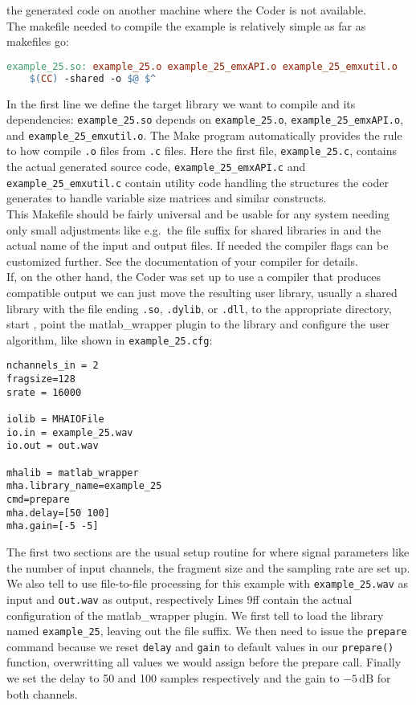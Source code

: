\documentclass[11pt,a4paper,twoside]{article}
\newcommand{\+}{\discretionary{\mbox{\scriptsize$\hookleftarrow$}}{}{}}
\begin{document}
the generated code on another machine where the Coder is not available. \\
The makefile needed to compile the example is relatively simple as far as
makefiles go:
\begin{lstlisting}[language=make]
example_25.so: example_25.o example_25_emxAPI.o example_25_emxutil.o
    $(CC) -shared -o $@ $^
\end{lstlisting}
In the first line we define the target library we want to compile and its dependencies:
\texttt{example\_25.so} depends on \texttt{example\_25.o}, \texttt{example\_25\_emxAPI.o}, 
and \texttt{example\_25\_emxutil.o}. The Make program automatically provides the rule 
to how compile \texttt{.o} files from \texttt{.c} files.
Here the first file, \texttt{example\_25.c}, contains the actual
generated source code, \texttt{example\_25\_emxAPI.c} and
\texttt{example\_25\_emxutil.c} contain utility code handling the structures the
\Matlab{} coder generates to handle variable size matrices and similar
constructs. \\
This Makefile should be fairly universal and be usable for any system needing only 
small adjustments like e.g.\ the file suffix for shared libraries in and the actual 
name of the input and output files. If needed the compiler flags can be customized further.
See the documentation of your compiler for details. \\
If, on the other hand, the \Matlab{} Coder was set up to use a compiler that produces \mha{} compatible
output we can just move the resulting user library, usually a shared library with the file ending
\texttt{.so}, \texttt{.dylib}, or \texttt{.dll}, to the appropriate directory, start \mha{},
point the matlab\_wrapper plugin to the library and configure the user
algorithm, like shown in \texttt{example\_25.cfg}:
\begin{lstlisting}
nchannels_in = 2
fragsize=128
srate = 16000

iolib = MHAIOFile
io.in = example_25.wav
io.out = out.wav

mhalib = matlab_wrapper
mha.library_name=example_25
cmd=prepare
mha.delay=[50 100]
mha.gain=[-5 -5]
\end{lstlisting}
The first two sections are the usual setup routine for \mha{} where signal
parameters like the number of input channels, the fragment size and the sampling
rate are set up. We also tell \mha{} to use file-to-file processing for this
example with \texttt{example\_25.wav} as input and \texttt{out.wav} as output, respectively
Lines 9ff contain the actual configuration of the matlab\_wrapper plugin. We
first tell \mha{} to load the library named \texttt{example\_25}, leaving out the
file suffix. We then need to issue the \texttt{prepare} command because we reset
\texttt{delay} and \texttt{gain} to default values in our \texttt{prepare()}
function, overwritting all values we would assign before the prepare call.
Finally we set the delay to 50 and 100 samples respectively and the
gain to $-5\,\mathrm{dB}$ for both channels.
\end{document}
